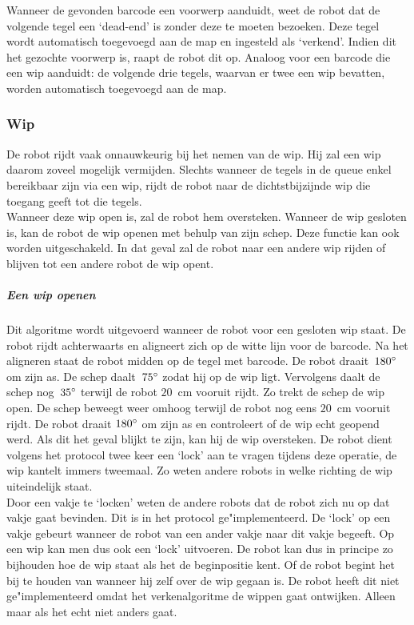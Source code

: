 \documentclass[eind]{penoverslag}
\begin{document}

Wanneer de gevonden barcode een voorwerp aanduidt, weet de robot dat de volgende tegel een `dead-end' is zonder deze te moeten bezoeken. Deze tegel wordt automatisch toegevoegd aan de map en ingesteld als `verkend'. Indien dit het gezochte voorwerp is, raapt de robot dit op.
Analoog voor een barcode die een wip aanduidt: de volgende drie tegels, waarvan er twee een wip bevatten, worden automatisch toegevoegd aan de map.


\subsubsection{Wip}
\label{sssec:AlgoWip}
De robot rijdt vaak onnauwkeurig bij het nemen van de wip. Hij zal een wip daarom zoveel mogelijk vermijden. Slechts wanneer de tegels in de queue enkel bereikbaar zijn via een wip, rijdt de robot naar de dichtstbijzijnde wip die toegang geeft tot die tegels.\\

Wanneer deze wip open is, zal de robot hem oversteken. Wanneer de wip gesloten is, kan de robot de wip openen met behulp van zijn schep. Deze functie kan ook worden uitgeschakeld. In dat geval zal de robot naar een andere wip rijden of blijven tot een andere robot de wip opent.

\subparagraph{Een wip openen} 
Dit algoritme wordt uitgevoerd wanneer de robot voor een gesloten wip staat. De robot rijdt achterwaarts en aligneert zich op de witte lijn voor de barcode. Na het aligneren staat de robot midden op de tegel met barcode. De robot draait~$180\degree$ om zijn as. De schep daalt~$75\degree$ zodat hij op de wip ligt. Vervolgens daalt de schep nog~$35\degree$ terwijl de robot $20$~cm vooruit rijdt. Zo trekt de schep de wip open. De schep beweegt weer omhoog terwijl de robot nog eens $20$~cm vooruit rijdt. De robot draait $180\degree$ om zijn as en controleert of de wip echt geopend werd. Als dit het geval blijkt te zijn, kan hij de wip oversteken. De robot dient volgens het protocol twee keer een `lock' aan te vragen tijdens deze operatie, de wip kantelt immers tweemaal. Zo weten andere robots in welke richting de wip uiteindelijk staat.\\
Door een vakje te `locken' weten de andere robots dat de robot zich nu op dat vakje gaat bevinden. Dit is in het protocol ge"implementeerd. De `lock' op een vakje gebeurt wanneer de robot van een ander vakje naar dit vakje begeeft. Op een wip kan men dus ook een `lock' uitvoeren. De robot kan dus in principe zo bijhouden hoe de wip staat als het de beginpositie kent. Of de robot begint het bij te houden van wanneer hij zelf over de wip gegaan is. De robot heeft dit niet ge"implementeerd omdat het verkenalgoritme de wippen gaat ontwijken. Alleen maar als het echt niet anders gaat. 
\end{document}
